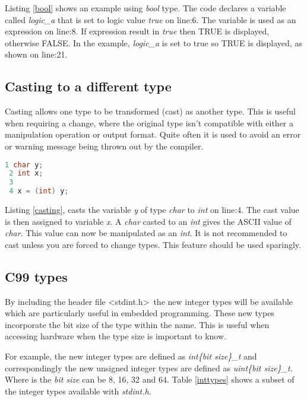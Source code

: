 Listing \ref{bool} shows an example using \textit{bool} type. The code declares a variable called \textit{logic\_a} that is set to logic value \textit{true} on line:6. The variable is used as an expression on line:8. If expression result in \textit{true} then TRUE is displayed, otherwise FALSE. In the example, \textit{logic\_a} is set to true so TRUE is displayed, as shown on line:21. 

\subsection{Casting to a different type}

Casting allows one type to be transformed (cast) as another type. This is useful when requiring a change, where the original type isn't compatible with either a manipulation operation or output format. Quite often it is used to avoid an error or warning message being thrown out by the compiler.\\

\begin{lstlisting}[language=C,showstringspaces=false,caption={Example casting, char to int},captionpos=b,label=casting]
 1 char y;
 2 int x;
 3  
 4 x = (int) y;
\end{lstlisting}

Listing \ref{casting}, casts the variable \textit{y} of type \textit{char} to \textit{int} on line:4. The cast value is then assigned to variable \textit{x}. A \textit{char} casted to an \textit{int} gives the ASCII value of \textit{char}. This value can now be manipulated as an \textit{int}. It is not recommended to cast unless you are forced to change types. This feature should be used sparingly.  

\subsection{C99 types}


By including the header file \textless stdint.h\textgreater \, the new integer types will be available which are particularly useful in embedded programming. These new types incorporate the bit size of the type within the name. This is useful when accessing hardware when the type size is important to know. 

For example, the new integer types are defined as \textit{int\{bit size\}\_t} and correspondingly the new unsigned integer types are defined as \textit{uint\{bit size\}\_t}. Where is the \textit{bit size} can be 8, 16, 32 and 64. Table \ref{inttypes} shows a subset of the integer types available with \textit{stdint.h}.


